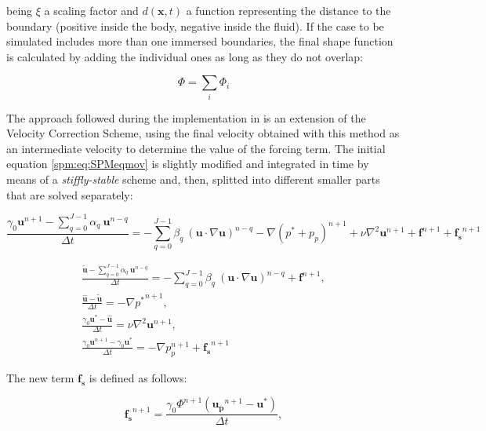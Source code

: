 being $\xi$ a scaling factor \cite{WangSPM} and $d(\mathbf{x}, t)$ a function
representing the distance to the boundary (positive inside the body, negative
inside the fluid). If the case to be simulated includes more than one immersed
boundaries, the final shape function is calculated by adding the individual ones
as long as they do not overlap:

\begin{equation}
    \Phi = \sum_i \Phi_i
\end{equation}

The approach followed during the implementation in \nek is an extension of the
Velocity Correction Scheme, using the final velocity obtained with this method
as an intermediate velocity to determine the value of the forcing term. The
initial equation \eqref{spm:eq:SPMeqmov} is slightly modified and integrated in
time by means of a \emph{stiffly-stable} scheme and, then, splitted into
different smaller parts that are solved separately:

\begin{equation}
     \frac{\gamma_0\mathbf{u}^{n+1}-\sum_{q=0}^{J-1}\alpha_q~\mathbf{u}^{n-q}}
        {\Delta t} = -\sum_{q=0}^{J-1}\beta_q~(\mathbf{u}\cdot
        \nabla\mathbf{u})^{n-q} -\nabla (p^*+p_p)^{n+1} +
        \nu\nabla^2\mathbf{u}^{n+1} + \mathbf{f}^{n+1} + \mathbf{f_s}^{n+1}
\end{equation}

\begin{subequations}
\begin{gather}
    \frac{\mathbf{\tilde{u}}-\sum_{q=0}^{J-1}\alpha_q~\mathbf{u}^{n-q}}
        {\Delta t} = -\sum_{q=0}^{J-1}\beta_q~(\mathbf{u}\cdot
        \nabla\mathbf{u})^{n-q} + \mathbf{f}^{n+1},\\
    \frac{\mathbf{\hat{u}}-\mathbf{\tilde{u}}}{\Delta t} =
        -\nabla {p^*}^{n+1},\\[3mm]
    \frac{\gamma_0\mathbf{u^*}-\mathbf{\hat{u}}}{\Delta t} =
        \nu\nabla^2\mathbf{u}^{n+1},\\[3mm]
    \frac{\gamma_0\mathbf{u}^{n+1}-\gamma_0\mathbf{u^*}}{\Delta t} =
        -\nabla p_p^{n+1} + \mathbf{f_s}^{n+1}
\end{gather}
\end{subequations}

The new term $\mathbf{f_s}$ is defined as follows:

\begin{equation}
    \mathbf{f_s}^{n+1} = \frac{\gamma_0\Phi^{n+1}(\mathbf{u_p}^{n+1}-
        \mathbf{u^*})}{\Delta t},
\end{equation}

